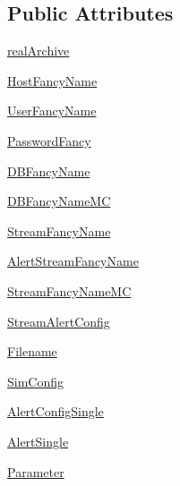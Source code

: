 \subsection*{Public Attributes}
\begin{DoxyCompactItemize}
\item 
\hyperlink{classamonpy_1_1dbase_1_1test_1_1test__db__write_1_1_test_d_b_write_a21f01f500a675067822bf868ce371306}{real\-Archive}
\item 
\hyperlink{classamonpy_1_1dbase_1_1test_1_1test__db__write_1_1_test_d_b_write_a1d99ea6d169624f39acc56254f9f7f30}{Host\-Fancy\-Name}
\item 
\hyperlink{classamonpy_1_1dbase_1_1test_1_1test__db__write_1_1_test_d_b_write_ab23c3c078c9ef84ff80e595d0906cd83}{User\-Fancy\-Name}
\item 
\hyperlink{classamonpy_1_1dbase_1_1test_1_1test__db__write_1_1_test_d_b_write_a69e2b25f75c000b814fa55d4945cd241}{Password\-Fancy}
\item 
\hyperlink{classamonpy_1_1dbase_1_1test_1_1test__db__write_1_1_test_d_b_write_a7b07a25b051063de016eaa355562eac3}{D\-B\-Fancy\-Name}
\item 
\hyperlink{classamonpy_1_1dbase_1_1test_1_1test__db__write_1_1_test_d_b_write_ad305c09b7cfbca1150be4b5819d0fdf4}{D\-B\-Fancy\-Name\-M\-C}
\item 
\hyperlink{classamonpy_1_1dbase_1_1test_1_1test__db__write_1_1_test_d_b_write_a12e956ebf3f624d6b36bb053369dd608}{Stream\-Fancy\-Name}
\item 
\hyperlink{classamonpy_1_1dbase_1_1test_1_1test__db__write_1_1_test_d_b_write_afe1cf31a726c2a34b3f8b3a5d130c3af}{Alert\-Stream\-Fancy\-Name}
\item 
\hyperlink{classamonpy_1_1dbase_1_1test_1_1test__db__write_1_1_test_d_b_write_a2096a0b2fb2fe15fcb2894f1a7d61c68}{Stream\-Fancy\-Name\-M\-C}
\item 
\hyperlink{classamonpy_1_1dbase_1_1test_1_1test__db__write_1_1_test_d_b_write_a2e1e2201ab54a4ea4eb59294ada2fd1a}{Stream\-Alert\-Config}
\item 
\hyperlink{classamonpy_1_1dbase_1_1test_1_1test__db__write_1_1_test_d_b_write_a9d4454368eabffc5e634852d7f6bf809}{Filename}
\item 
\hyperlink{classamonpy_1_1dbase_1_1test_1_1test__db__write_1_1_test_d_b_write_a23801af3747df6a10fe1e3e087f41ddc}{Sim\-Config}
\item 
\hyperlink{classamonpy_1_1dbase_1_1test_1_1test__db__write_1_1_test_d_b_write_a46fd1b5ec3c30b43fc1ba03a19603f3a}{Alert\-Config\-Single}
\item 
\hyperlink{classamonpy_1_1dbase_1_1test_1_1test__db__write_1_1_test_d_b_write_abf87a227a67042fea9ec1a8056656d77}{Alert\-Single}
\item 
\hyperlink{classamonpy_1_1dbase_1_1test_1_1test__db__write_1_1_test_d_b_write_a678e5a1daa722c397816fbcbf21aba3b}{Parameter}
\end{DoxyCompactItemize}


